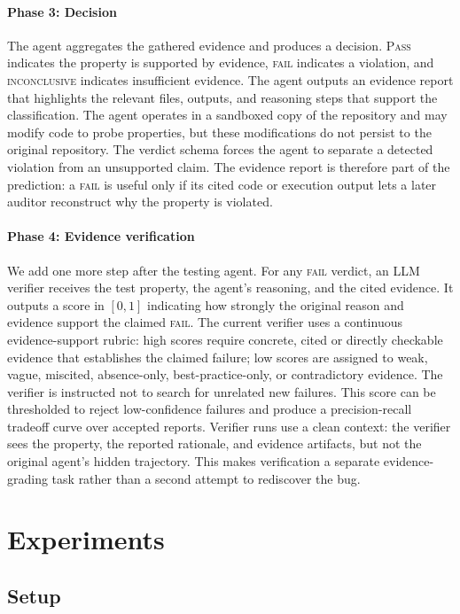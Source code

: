 \documentclass[11pt]{article}
\begin{document}
\paragraph{Phase 3: Decision}
The agent aggregates the gathered evidence and produces a decision.
\textsc{Pass} indicates the property is supported by evidence, \textsc{fail} indicates a violation, and \textsc{inconclusive} indicates insufficient evidence.
The agent outputs an evidence report that highlights the relevant files, outputs, and reasoning steps that support the classification.
The agent operates in a sandboxed copy of the repository and may modify code to probe properties, but these modifications do not persist to the original repository.
The verdict schema forces the agent to separate a detected violation from an unsupported claim.
The evidence report is therefore part of the prediction: a \textsc{fail} is useful only if its cited code or execution output lets a later auditor reconstruct why the property is violated.

\paragraph{Phase 4: Evidence verification}
We add one more step after the testing agent.
For any \textsc{fail} verdict, an LLM verifier receives the test property, the agent's reasoning, and the cited evidence.
It outputs a score in $[0,1]$ indicating how strongly the original reason and evidence support the claimed \textsc{fail}.
The current verifier uses a continuous evidence-support rubric: high scores require concrete, cited or directly checkable evidence that establishes the claimed failure; low scores are assigned to weak, vague, miscited, absence-only, best-practice-only, or contradictory evidence.
The verifier is instructed not to search for unrelated new failures.
This score can be thresholded to reject low-confidence failures and produce a precision-recall tradeoff curve over accepted reports.
Verifier runs use a clean context: the verifier sees the property, the reported rationale, and evidence artifacts, but not the original agent's hidden trajectory.
This makes verification a separate evidence-grading task rather than a second attempt to rediscover the bug.

\section{Experiments}
\subsection{Setup}
\end{document}
